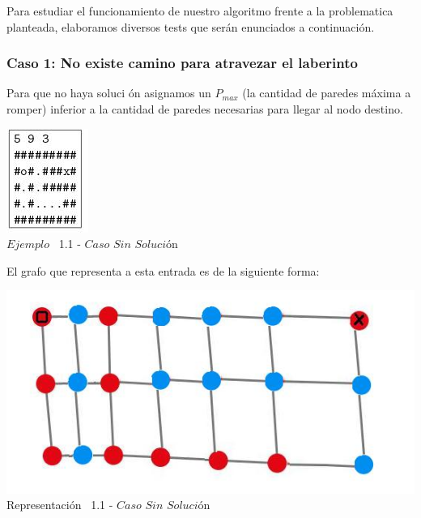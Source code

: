 \indent Para estudiar el funcionamiento de nuestro algoritmo frente a la problematica planteada, elaboramos diversos tests que ser\'an enunciados a continuaci\'on.\\

\begin{center}
 \subsubsection*{Caso 1: No existe camino para atravezar el laberinto}
\end{center}

Para que no haya soluci \'on asignamos un $P_{max}$ (la cantidad de paredes m\'axima a romper) inferior a la cantidad de paredes necesarias para llegar al nodo destino.\\
 
\vspace*{0.3cm} \vspace*{0.3cm}
  \begin{center}
 \includegraphics[scale=1.60]{./EJ1/ej1sinsolucion.jpeg}
\\{$Ejemplo$ \ 1.1 - $Caso$ $Sin$ $Soluci$\'on}
  \end{center}
  \vspace*{0.3cm}

El grafo que representa a esta entrada es de la siguiente forma:\\

\vspace*{0.3cm} \vspace*{0.3cm}
  \begin{center}
 \includegraphics[scale=0.5]{./EJ1/ej1grafosinsolucion.jpeg}
 \\{Representaci\'on \ 1.1 - $Caso$ $Sin$ $Soluci$\'on}
  \end{center}
  \vspace*{0.3cm}

